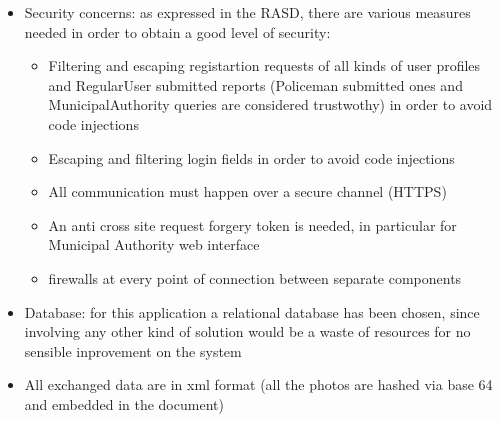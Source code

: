 \begin{itemize}
	\item Security concerns: as expressed in the RASD, there are various measures needed in order to obtain a good level of security:
	\begin{itemize}
		\item Filtering and escaping registartion requests of all kinds of user profiles and RegularUser submitted reports (Policeman submitted ones and MunicipalAuthority queries are considered trustwothy) in order to avoid code injections
		\item Escaping and filtering login fields in order to avoid code injections
		\item All communication must happen over a secure channel (HTTPS)
		\item An anti cross site request forgery token is needed, in particular for Municipal Authority web interface
		\item firewalls at every point of connection between separate components
	\end{itemize}
	
	\item Database: for this application a relational database has been chosen, since involving any other kind of solution would be a waste of resources for no sensible inprovement on the system
	
	\item All exchanged data are in xml format (all the photos are hashed via base 64 and embedded in the document)
\end{itemize}